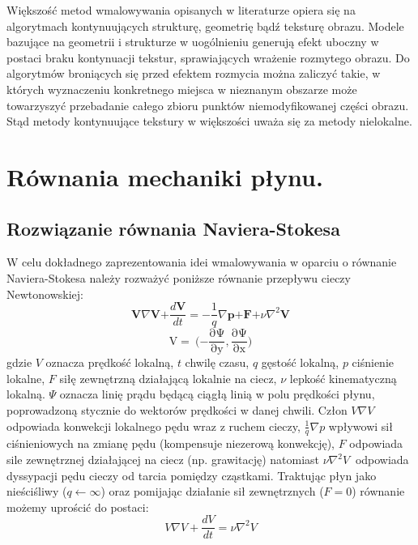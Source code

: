 \documentclass[12pt, twoside, openany]{report}
\theoremstyle{definition}
\begin{document}
Większość metod wmalowywania opisanych w literaturze opiera się na algorytmach kontynuujących strukturę, geometrię bądź teksturę obrazu. Modele bazujące na geometrii i strukturze w uogólnieniu generują efekt uboczny w postaci braku kontynuacji tekstur, sprawiających wrażenie rozmytego obrazu. Do algorytmów broniących się przed efektem rozmycia można zaliczyć takie, w których wyznaczeniu konkretnego miejsca w nieznanym obszarze może towarzyszyć przebadanie całego zbioru punktów niemodyfikowanej części obrazu. Stąd metody kontynuujące tekstury w większości uważa się za metody nielokalne.
\chapter{Równania mechaniki płynu.}
\label{chap:navierstokes}
\section{Rozwiązanie równania Naviera-Stokesa }
W celu dokładnego zaprezentowania idei wmalowywania w oparciu o równanie Naviera-Stokesa należy rozważyć poniższe równanie przepływu cieczy Newtonowskiej:
\begin{equation}
\mathbf{V}\nabla \mathbf{V}\mathrm{+}\frac{d\mathbf{V}}{dt}\mathrm{=-}\frac{\mathrm{1}}{q}\nabla \mathbf{p}\mathrm{+}\mathbf{F}\mathrm{+}\nu {\nabla }^{\mathrm{2}}\mathbf{V}
\label{NavierStokesEquation}
\end{equation}
\begin{equation}
\mathrm{V=\ (-}\frac{\mathrm{\partial }\mathrm{\Psi }}{\mathrm{\partial }\mathrm{y}},\frac{\mathrm{\partial }\mathrm{\Psi }}{\mathrm{\partial }\mathrm{x}}\mathrm{)}
\label{LiquidVelociy}
\end{equation}
gdzie $V$ oznacza prędkość lokalną, $t$ chwilę czasu, $q$ gęstość lokalną, $p$ ciśnienie lokalne, $F$ siłę zewnętrzną działającą lokalnie na ciecz, $\nu$ lepkość kinematyczną lokalną. $\mathit{\Psi}$ oznacza linię prądu będącą ciągłą linią w polu prędkości płynu, poprowadzoną
stycznie do wektorów prędkości w danej chwili. Człon $V\nabla V$ odpowiada konwekcji lokalnego pędu wraz z ruchem cieczy, $\frac{1}{q}\nabla p$ wpływowi sił ciśnieniowych na zmianę pędu (kompensuje niezerową konwekcję),  $F$ odpowiada sile zewnętrznej działającej na ciecz (np. grawitację) natomiast $\nu {\nabla }^2V\ $ odpowiada dyssypacji pędu cieczy od tarcia pomiędzy cząstkami. Traktując płyn jako nieściśliwy ($q \leftarrow \infty $)  oraz pomijając działanie sił zewnętrznych ($F=0$)  równanie możemy uprościć do postaci:
\begin{equation}
 V\nabla V+\frac{dV}{dt}=\nu {\nabla }^2V
\label{NavierStokesEquationShort}
\end{equation}
\end{document}
